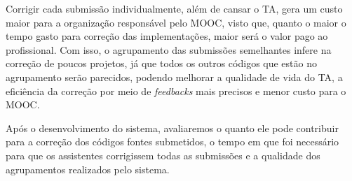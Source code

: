Corrigir cada submissão individualmente, além de cansar o TA, gera um custo maior
para a organização responsável pelo MOOC, visto que, quanto o maior o tempo gasto
para correção das implementações, maior será o valor pago ao profissional. Com
isso, o agrupamento das submissões semelhantes infere na correção de poucos
projetos, já que todos os outros códigos que estão no agrupamento serão
parecidos, podendo melhorar a qualidade de vida do TA, a eficiência da correção
por meio de \textit{feedbacks} mais precisos e menor custo para o MOOC.

Após o desenvolvimento do sistema, avaliaremos o quanto ele pode contribuir para
a correção dos códigos fontes submetidos, o tempo em que foi necessário para que
os assistentes corrigissem todas as submissões e a qualidade dos agrupamentos
realizados pelo sistema.